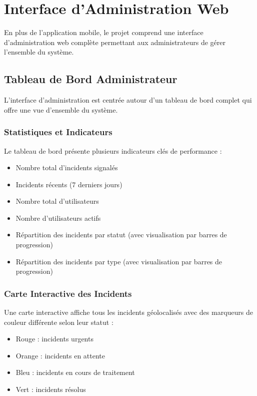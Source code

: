 \documentclass[12pt,a4paper]{article}
\begin{document}
\section{Interface d'Administration Web}

En plus de l'application mobile, le projet comprend une interface d'administration web complète permettant aux administrateurs de gérer l'ensemble du système.

\subsection{Tableau de Bord Administrateur}

L'interface d'administration est centrée autour d'un tableau de bord complet qui offre une vue d'ensemble du système.

\subsubsection{Statistiques et Indicateurs}

Le tableau de bord présente plusieurs indicateurs clés de performance :
\begin{itemize}
    \item Nombre total d'incidents signalés
    \item Incidents récents (7 derniers jours)
    \item Nombre total d'utilisateurs
    \item Nombre d'utilisateurs actifs
    \item Répartition des incidents par statut (avec visualisation par barres de progression)
    \item Répartition des incidents par type (avec visualisation par barres de progression)
\end{itemize}

\subsubsection{Carte Interactive des Incidents}

Une carte interactive affiche tous les incidents géolocalisés avec des marqueurs de couleur différente selon leur statut :
\begin{itemize}
    \item Rouge : incidents urgents
    \item Orange : incidents en attente
    \item Bleu : incidents en cours de traitement
    \item Vert : incidents résolus
\end{itemize}
\end{document}
